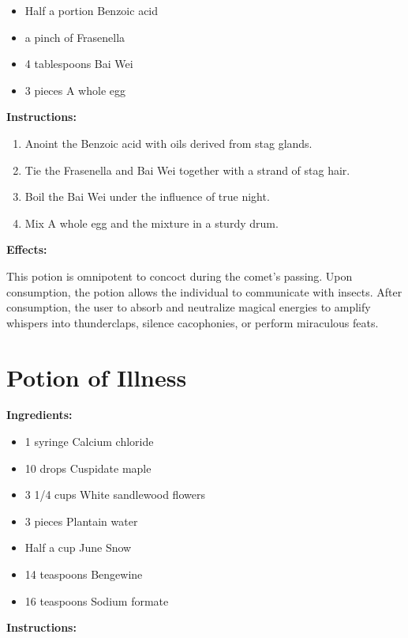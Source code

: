 \documentclass{article}
\begin{document}
\begin{itemize}
  \item Half a portion Benzoic acid
  \item a pinch of Frasenella
  \item 4 tablespoons Bai Wei
  \item 3 pieces A whole egg
\end{itemize}

\textbf{Instructions:}

\begin{enumerate}
  \item Anoint the Benzoic acid with oils derived from stag glands.
  \item Tie the Frasenella and Bai Wei together with a strand of stag hair.
  \item Boil the Bai Wei under the influence of true night.
  \item Mix A whole egg and the mixture in a sturdy drum.
\end{enumerate}

\textbf{Effects:}

This potion is omnipotent to concoct during the comet’s passing. Upon consumption, the potion allows the individual to communicate with insects. After consumption, the user to absorb and neutralize magical energies to amplify whispers into thunderclaps, silence cacophonies, or perform miraculous feats.

\newpage
\section*{Potion of Illness}

\textbf{Ingredients:}

\begin{itemize}
  \item 1 syringe Calcium chloride
  \item 10 drops Cuspidate maple
  \item 3 1/4 cups White sandlewood flowers
  \item 3 pieces Plantain water
  \item Half a cup June Snow
  \item 14 teaspoons Bengewine
  \item 16 teaspoons Sodium formate
\end{itemize}

\textbf{Instructions:}
\end{document}
